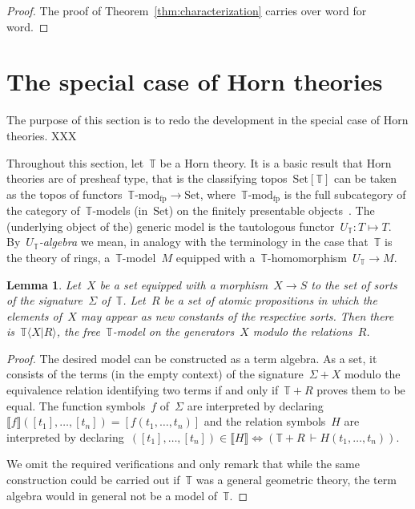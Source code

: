\documentclass[oneside,reqno]{amsart}
\theoremstyle{definition}
\theoremstyle{plain}
\newtheorem{lemma}[defn]{Lemma}
\theoremstyle{remark}
\newcommand{\TT}{\mathbb{T}}
\newcommand{\Set}{\mathrm{Set}}
\renewcommand{\_}{\mathpunct{.}\,}
\newcommand{\?}{\,{:}\,}
\newcommand{\brak}[1]{\llbracket #1 \rrbracket}
\newcommand{\Mod}[1]{{#1}\mathrm{\text{-}mod}}
\begin{document}
\begin{proof}The proof of Theorem~\ref{thm:characterization} carries over word
for word.
\end{proof}


\section{The special case of Horn theories}
\label{sect:horn}

The purpose of this section is to redo the development in the special case of
Horn theories. XXX

Throughout this section, let~$\TT$ be a Horn theory. It is a basic result that
Horn theories are of presheaf type, that is the classifying topos~$\Set[\TT]$
can be taken as the topos of functors~$\Mod{\TT}_\mathrm{fp} \to \Set$,
where~$\Mod{\TT}_\mathrm{fp}$ is the full subcategory of the category
of~$\TT$-models (in~$\Set$) on the finitely presentable objects~\cite[Theorem~2.1.21]{caramello:tst}. The
(underlying object of the) generic model is the tautologous functor~$U_\TT : T
\mapsto T$. By~\emph{$U_\TT$-algebra} we mean, in analogy with the terminology in
the case that~$\TT$ is the theory of rings, a~$\TT$-model~$M$ equipped with
a~$\TT$-homomorphism~$U_\TT \to M$.


\begin{lemma}\label{lemma:free-models}
Let~$X$ be a set equipped with a morphism~$X \to S$ to the set of sorts
of the signature~$\Sigma$ of~$\TT$. Let~$R$ be a set of atomic propositions in which the
elements of~$X$ may appear as new constants of the respective sorts. Then there
is~$\TT\langle X | R \rangle$, the free~$\TT$-model on the generators~$X$ modulo
the relations~$R$.\end{lemma}

\begin{proof}The desired model can be constructed as a term algebra. As a set,
it consists of the terms (in the empty context) of the signature~$\Sigma + X$
modulo the equivalence relation identifying two terms if and only if~$\TT + R$
proves them to be equal. The function symbols~$f$ of~$\Sigma$ are interpreted
by declaring~$\brak{f}([t_1],\ldots,[t_n]) = [f(t_1,\ldots,t_n)]$ and the
relation symbols~$H$ are interpreted by declaring~$([t_1],\ldots,[t_n]) \in
\brak{H} \Leftrightarrow (\TT + R \,\vdash H(t_1,\ldots,t_n))$.

We omit the required verifications and only remark that while the same
construction could be carried out if~$\TT$ was a general geometric theory, the
term algebra would in general not be a model of~$\TT$.
\end{proof}
\end{document}
